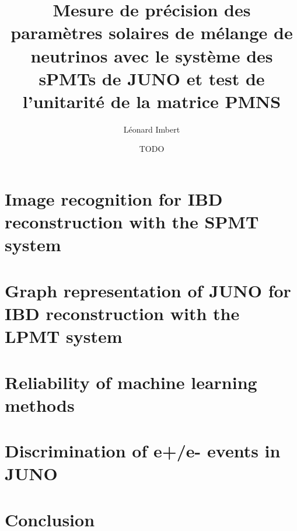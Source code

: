 \documentclass[12pt]{report}
\title{Mesure de précision des paramètres solaires de mélange de neutrinos avec le système des sPMTs de JUNO et test de l'unitarité de la matrice PMNS}
\author{Léonard Imbert}
\date{TODO}
\begin{document}


\tableofcontents











\chapter{Image recognition for IBD reconstruction with the SPMT system}

\chapter{Graph representation of JUNO for IBD reconstruction with the LPMT system}

\chapter{Reliability of machine learning methods}

\chapter{Discrimination of e+/e- events in JUNO}

\chapter{Conclusion}
\end{document}
